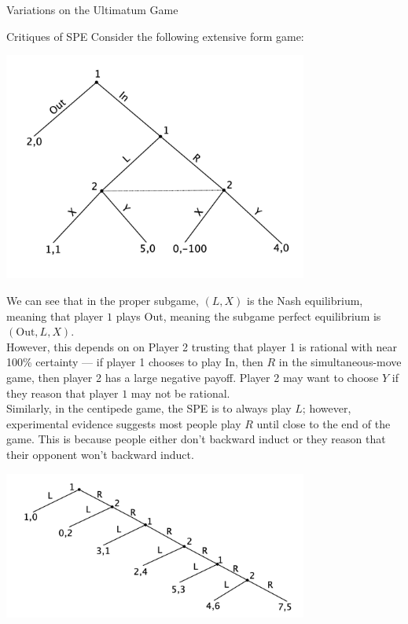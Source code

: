 \documentclass[8pt]{extarticle}
\begin{document}
  \begin{problem}{Variations on the Ultimatum Game}
    \begin{tcbraster}[raster columns = 1,colframe = black!75!white,colback=white]
    \end{tcbraster}
  \end{problem}
  \begin{problem}{Critiques of SPE}
    Consider the following extensive form game:
    \begin{center}
      \includegraphics[width=10cm]{images/spe_critique.png}
    \end{center}
    We can see that in the proper subgame, $(L,X)$ is the Nash equilibrium, meaning that player $1$ plays Out, meaning the subgame perfect equilibrium is $(\text{Out},L,X)$.\\

    However, this depends on on Player 2 trusting that player 1 is rational with near 100\% certainty --- if player 1 chooses to play In, then $R$ in the simultaneous-move game, then player 2 has a large negative payoff. Player 2 may want to choose $Y$ if they reason that player $1$ may not be rational.\\

    Similarly, in the centipede game, the SPE is to always play $L$; however, experimental evidence suggests most people play $R$ until close to the end of the game. This is because people either don't backward induct or they reason that their opponent won't backward induct.
    \begin{center}
      \includegraphics[width=10cm]{images/centipede.png}
    \end{center}
  \end{problem}
\end{document}
